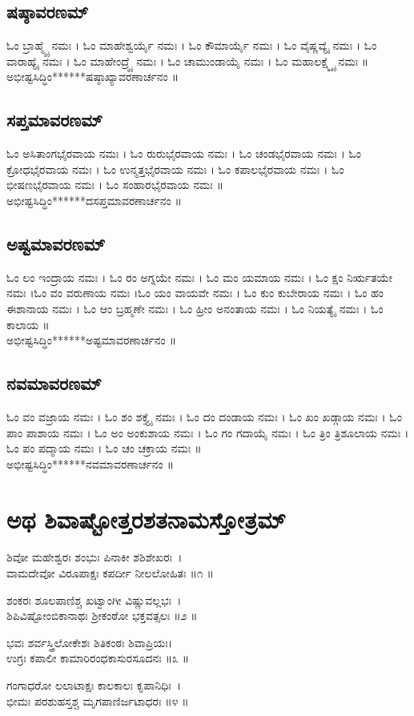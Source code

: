 \subsection{ಷಷ್ಠಾವರಣಮ್}
ಓಂ ಬ್ರಾಹ್ಮ್ಯೈ ನಮಃ । ಓಂ ಮಾಹೇಶ್ವರ್ಯೈ ನಮಃ । ಓಂ ಕೌಮಾರ್ಯೈ ನಮಃ । ಓಂ ವೈಷ್ಣವ್ಯೈ ನಮಃ । ಓಂ ವಾರಾಹ್ಯೈ ನಮಃ । ಓಂ ಮಾಹೇಂದ್ರ್ಯೈ ನಮಃ । ಓಂ ಚಾಮುಂಡಾಯೈ ನಮಃ । ಓಂ ಮಹಾಲಕ್ಷ್ಮ್ಯೈ ನಮಃ ॥\\
ಅಭೀಷ್ಟಸಿದ್ಧಿಂ******ಷಷ್ಠಾಖ್ಯಾವರಣಾರ್ಚನಂ ॥
\subsection{ಸಪ್ತಮಾವರಣಮ್}
ಓಂ ಅಸಿತಾಂಗಭೈರವಾಯ ನಮಃ । ಓಂ ರುರುಭೈರವಾಯ ನಮಃ । ಓಂ ಚಂಡಭೈರವಾಯ ನಮಃ । ಓಂ ಕ್ರೋಧಭೈರವಾಯ ನಮಃ । ಓಂ ಉನ್ಮತ್ತಭೈರವಾಯ ನಮಃ । ಓಂ ಕಪಾಲಭೈರವಾಯ ನಮಃ । ಓಂ ಭೀಷಣಭೈರವಾಯ ನಮಃ । ಓಂ ಸಂಹಾರಭೈರವಾಯ ನಮಃ ॥\\%
ಅಭೀಷ್ಟಸಿದ್ಧಿಂ******ದಸಪ್ತಮಾವರಣಾರ್ಚನಂ ॥
\subsection{ಅಷ್ಟಮಾವರಣಮ್}
ಓಂ ಲಂ ಇಂದ್ರಾಯ ನಮಃ । ಓಂ ರಂ ಅಗ್ನಯೇ ನಮಃ । ಓಂ ಮಂ ಯಮಾಯ ನಮಃ । ಓಂ ಕ್ಷಂ ನಿರ್ಋತಯೇ ನಮಃ ।ಓಂ ವಂ ವರುಣಾಯ ನಮಃ ।ಓಂ ಯಂ ವಾಯವೇ ನಮಃ । ಓಂ ಕುಂ ಕುಬೇರಾಯ ನಮಃ । ಓಂ ಹಂ ಈಶಾನಾಯ ನಮಃ । ಓಂ ಆಂ ಬ್ರಹ್ಮಣೇ ನಮಃ । ಓಂ ಹ್ರೀಂ ಅನಂತಾಯ ನಮಃ । ಓಂ ನಿಯತ್ಯೈ ನಮಃ । ಓಂ ಕಾಲಾಯ ॥\\
ಅಭೀಷ್ಟಸಿದ್ಧಿಂ******ಅಷ್ಟಮಾವರಣಾರ್ಚನಂ ॥
\subsection{ನವಮಾವರಣಮ್}
ಓಂ ವಂ ವಜ್ರಾಯ ನಮಃ । ಓಂ ಶಂ ಶಕ್ತ್ಯೈ ನಮಃ । ಓಂ ದಂ ದಂಡಾಯ ನಮಃ । ಓಂ ಖಂ ಖಡ್ಗಾಯ ನಮಃ । ಓಂ ಪಾಂ ಪಾಶಾಯ ನಮಃ । ಓಂ ಅಂ ಅಂಕುಶಾಯ ನಮಃ । ಓಂ ಗಂ ಗದಾಯೈ ನಮಃ । ಓಂ  ತ್ರಿಂ  ತ್ರಿಶೂಲಾಯ ನಮಃ । ಓಂ ಪಂ ಪದ್ಮಾಯ ನಮಃ । ಓಂ ಚಂ ಚಕ್ರಾಯ ನಮಃ ॥\\
ಅಭೀಷ್ಟಸಿದ್ಧಿಂ******ನವಮಾವರಣಾರ್ಚನಂ ॥
\section{ಅಥ ಶಿವಾಷ್ಟೋತ್ತರಶತನಾಮಸ್ತೋತ್ರಮ್ }
ಶಿವೋ ಮಹೇಶ್ವರಃ ಶಂಭುಃ ಪಿನಾಕೀ ಶಶಿಶೇಖರಃ~।\\
ವಾಮದೇವೋ ವಿರೂಪಾಕ್ಷಃ ಕಪರ್ದೀ ನೀಲಲೋಹಿತಃ ॥೧ ॥

ಶಂಕರಃ ಶೂಲಪಾಣಿಶ್ಚ ಖಟ್ವಾಂಗೀ ವಿಷ್ಣುವಲ್ಲಭಃ~।\\
ಶಿಪಿವಿಷ್ಟೋಂಬಿಕಾನಾಥಃ ಶ್ರೀಕಂಠೋ ಭಕ್ತವತ್ಸಲಃ ॥೨ ॥

ಭವಃ ಶರ್ವಸ್ತ್ರಿಲೋಕೇಶಃ ಶಿತಿಕಂಠಃ ಶಿವಾಪ್ರಿಯಃ।\\
ಉಗ್ರಃ ಕಪಾಲೀ ಕಾಮಾರಿರಂಧಕಾಸುರಸೂದನಃ ॥೩ ॥

ಗಂಗಾಧರೋ ಲಲಾಟಾಕ್ಷಃ ಕಾಲಕಾಲಃ ಕೃಪಾನಿಧಿಃ~।\\
ಭೀಮಃ ಪರಶುಹಸ್ತಶ್ಚ ಮೃಗಪಾಣಿರ್ಜಟಾಧರಃ ॥೪ ॥

